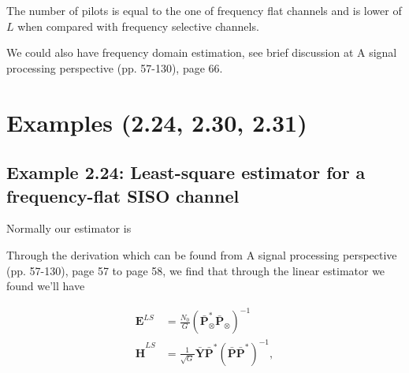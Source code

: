 \documentclass[a4paper, 12pt]{book}
\begin{document}
\begin{center}
\end{center}

The number of pilots is equal to the one of frequency flat channels and is lower of $L$ when compared with frequency selective channels.

We could also have frequency domain estimation, see brief discussion at A signal processing perspective (pp. 57-130), page 66.

\section*{Examples (2.24, 2.30, 2.31)}

\subsection*{Example 2.24: Least-square estimator for a frequency-flat SISO channel}

Normally our estimator is

Through the derivation which can be found from A signal processing perspective (pp. 57-130), page 57 to page 58, we find that through the linear estimator we found we'll have

\begin{align}
\boldsymbol{E}^{LS} &= \frac{N_0}{G}(\bar{\boldsymbol{P}}_{\otimes}^* \bar{\boldsymbol{P}}_{\otimes})^{-1} \tag{2.239} \\
\hat{\boldsymbol{H}}^{LS} &= \frac{1}{\sqrt{G}} \bar{\boldsymbol{Y}} \bar{\boldsymbol{P}}^* (\bar{\boldsymbol{P}}\bar{\boldsymbol{P}}^*)^{-1}, \tag{2.247}
\end{align}
\end{document}
